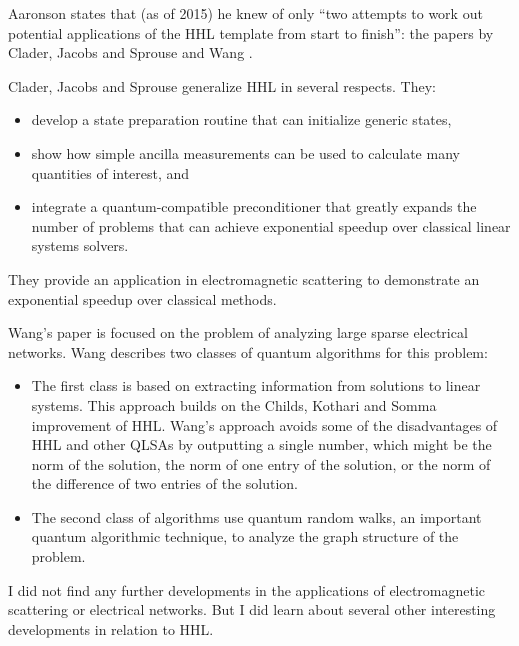 \documentclass[12pt]{extarticle}
\begin{document}
Aaronson states that (as of 2015) he knew of only ``two attempts to work out potential applications of the HHL template from start to finish'':
the papers by Clader, Jacobs and Sprouse \cite{clader2013preconditioned} and Wang \cite{wang2017efficient}.

Clader, Jacobs and Sprouse generalize HHL in several respects. They:
\begin{itemize}
\item develop a state preparation routine that can initialize generic states,
\item show how simple ancilla measurements can be used to calculate many quantities of interest, and
\item integrate a quantum-compatible preconditioner that greatly expands the number of problems that can achieve exponential speedup over classical linear systems solvers.
\end{itemize}
They provide an application in electromagnetic scattering to demonstrate an exponential speedup over classical methods.

Wang's paper is focused on the problem of analyzing large sparse electrical networks.
Wang describes two classes of quantum algorithms for this problem:
\begin{itemize}
\item The first class is based on extracting information from solutions to linear systems.
This approach builds on the Childs, Kothari and Somma\cite{somma2016quantum} improvement of HHL.
Wang's approach avoids some of the disadvantages of HHL and other QLSAs by outputting a single number,
which might be the norm of the solution, the norm of one entry of the solution, or the norm of the difference of two entries of the solution.
\item The second class of algorithms use quantum random walks, an important quantum algorithmic technique,
to analyze the graph structure of the problem.
\end{itemize}

I did not find any further developments in the applications of electromagnetic scattering or electrical networks.
But I did learn about several other interesting developments in relation to HHL.

\end{document}
